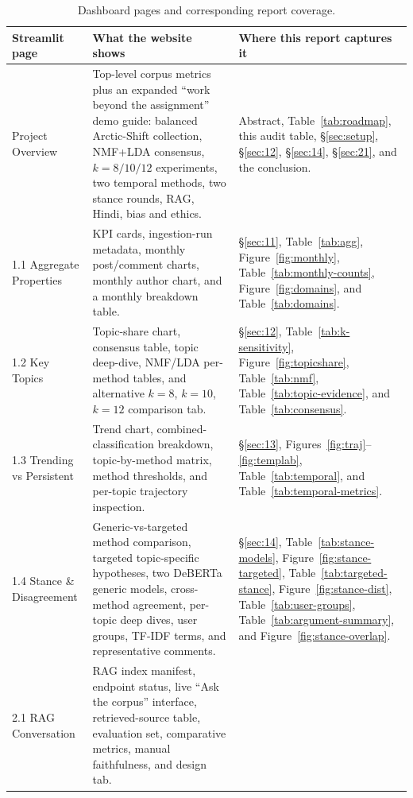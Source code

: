 \documentclass[11pt,a4paper]{article}
\begin{document}
\begin{table}[H]
\centering
\footnotesize
\caption{Dashboard pages and corresponding report coverage.}
\label{tab:dashboard-audit}
\renewcommand{\arraystretch}{1.18}
\begin{tabularx}{\linewidth}{p{2.7cm} X X}
\toprule
\textbf{Streamlit page} & \textbf{What the website shows} & \textbf{Where this report captures it} \\
\midrule
Project Overview &
Top-level corpus metrics plus an expanded ``work beyond the assignment'' demo guide: balanced Arctic-Shift collection, NMF+LDA consensus, \(k=8/10/12\) experiments, two temporal methods, two stance rounds, RAG, Hindi, bias and ethics. &
Abstract, Table~\ref{tab:roadmap}, this audit table, \S\ref{sec:setup}, \S\ref{sec:12}, \S\ref{sec:14}, \S\ref{sec:21}, and the conclusion. \\
1.1 Aggregate Properties &
KPI cards, ingestion-run metadata, monthly post/comment charts, monthly author chart, and a monthly breakdown table. &
\S\ref{sec:11}, Table~\ref{tab:agg}, Figure~\ref{fig:monthly}, Table~\ref{tab:monthly-counts}, Figure~\ref{fig:domains}, and Table~\ref{tab:domains}. \\
1.2 Key Topics &
Topic-share chart, consensus table, topic deep-dive, NMF/LDA per-method tables, and alternative \(k=8\), \(k=10\), \(k=12\) comparison tab. &
\S\ref{sec:12}, Table~\ref{tab:k-sensitivity}, Figure~\ref{fig:topicshare}, Table~\ref{tab:nmf}, Table~\ref{tab:topic-evidence}, and Table~\ref{tab:consensus}. \\
1.3 Trending vs Persistent &
Trend chart, combined-classification breakdown, topic-by-method matrix, method thresholds, and per-topic trajectory inspection. &
\S\ref{sec:13}, Figures~\ref{fig:traj}--\ref{fig:templab}, Table~\ref{tab:temporal}, and Table~\ref{tab:temporal-metrics}. \\
1.4 Stance \& Disagreement &
Generic-vs-targeted method comparison, targeted topic-specific hypotheses, two DeBERTa generic models, cross-method agreement, per-topic deep dives, user groups, TF-IDF terms, and representative comments. &
\S\ref{sec:14}, Table~\ref{tab:stance-models}, Figure~\ref{fig:stance-targeted}, Table~\ref{tab:targeted-stance}, Figure~\ref{fig:stance-dist}, Table~\ref{tab:user-groups}, Table~\ref{tab:argument-summary}, and Figure~\ref{fig:stance-overlap}. \\
2.1 RAG Conversation &
RAG index manifest, endpoint status, live ``Ask the corpus'' interface, retrieved-source table, evaluation set, comparative metrics, manual faithfulness, and design tab. &

\end{tabularx}
\end{table}
\end{document}
